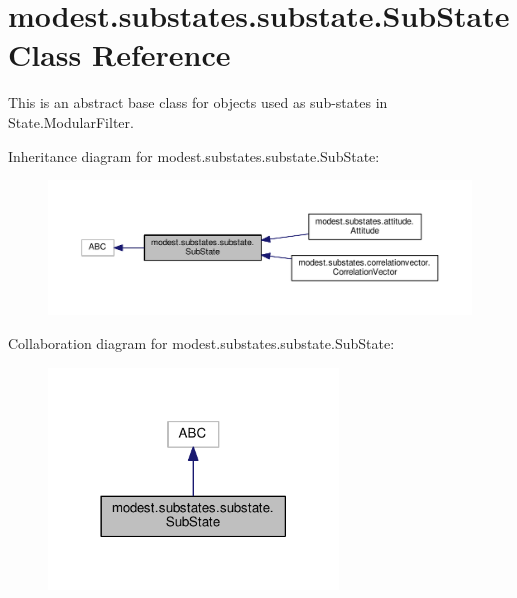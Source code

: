 \hypertarget{classmodest_1_1substates_1_1substate_1_1SubState}{}\section{modest.\+substates.\+substate.\+Sub\+State Class Reference}
\label{classmodest_1_1substates_1_1substate_1_1SubState}


This is an abstract base class for objects used as sub-\/states in State.\+Modular\+Filter.  




Inheritance diagram for modest.\+substates.\+substate.\+Sub\+State\+:\nopagebreak
\begin{figure}[H]
\begin{center}
\leavevmode
\includegraphics[width=350pt]{classmodest_1_1substates_1_1substate_1_1SubState__inherit__graph}
\end{center}
\end{figure}


Collaboration diagram for modest.\+substates.\+substate.\+Sub\+State\+:\nopagebreak
\begin{figure}[H]
\begin{center}
\leavevmode
\includegraphics[width=218pt]{classmodest_1_1substates_1_1substate_1_1SubState__coll__graph}
\end{center}
\end{figure}
